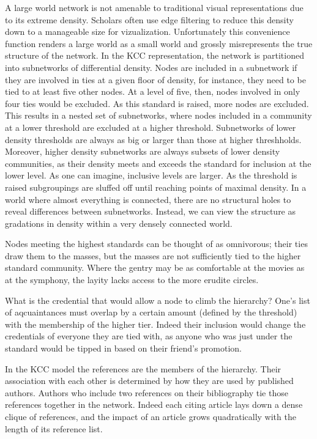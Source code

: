 \documentclass[]{book}
\theoremstyle{definition}
\theoremstyle{definition}
\theoremstyle{definition}
\theoremstyle{remark}
\begin{document}
A large world network is not amenable to traditional visual
representations due to its extreme density. Scholars often use edge
filtering to reduce this density down to a manageable size for
vizualization. Unfortunately this convenience function renders a large
world as a small world and grossly misrepresents the true structure of
the network. In the KCC representation, the network is partitioned into
subnetworks of differential density. Nodes are included in a subnetwork
if they are involved in ties at a given floor of density, for instance,
they need to be tied to at least five other nodes. At a level of five,
then, nodes involved in only four ties would be excluded. As this
standard is raised, more nodes are excluded. This results in a nested
set of subnetworks, where nodes included in a community at a lower
threshold are excluded at a higher threshold. Subnetworks of lower
density thresholds are always as big or larger than those at higher
threshholds. Moreover, higher density subnetworks are always subsets of
lower density communities, as their density meets and exceeds the
standard for inclusion at the lower level. As one can imagine, inclusive
levels are larger. As the threshold is raised subgroupings are sluffed
off until reaching points of maximal density. In a world where almost
everything is connected, there are no structural holes to reveal
differences between subnetworks. Instead, we can view the structure as
gradations in density within a very densely connected world.

Nodes meeting the highest standards can be thought of as omnivorous;
their ties draw them to the masses, but the masses are not sufficiently
tied to the higher standard community. Where the gentry may be as
comfortable at the movies as at the symphony, the layity lacks access to
the more erudite circles.

What is the credential that would allow a node to climb the hierarchy?
One's list of aqcuaintances must overlap by a certain amount (defined by
the threshold) with the membership of the higher tier. Indeed their
inclusion would change the credentials of everyone they are tied with,
as anyone who was just under the standard would be tipped in based on
their friend's promotion.

In the KCC model the references are the members of the hierarchy. Their
association with each other is determined by how they are used by
published authors. Authors who include two references on their
bibliography tie those references together in the network. Indeed each
citing article lays down a dense clique of references, and the impact of
an article grows quadratically with the length of its reference list.
\end{document}
